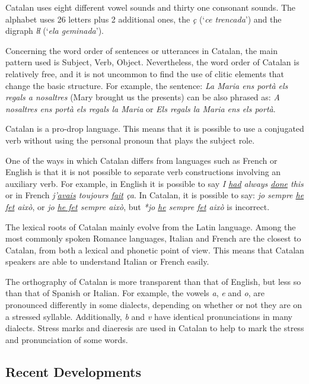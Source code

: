 \begin{multicols}{2}
Catalan uses eight different vowel sounds and thirty one consonant sounds. The alphabet uses 26 letters plus 2 additional ones, the \textit{ç} (‘\textit{ce trencada}’) and the digraph \textit{ŀl} (‘\textit{ela geminada}’).


Concerning the word order of sentences or utterances in Catalan, the main pattern used is Subject, Verb, Object. Nevertheless, the word order of Catalan is relatively free, and it is not uncommon to find the use of clitic elements that change the basic structure. For example, the sentence: \textit{La Maria ens portà els regals a nosaltres} (Mary brought us the presents) can be also phrased as: \textit{A nosaltres ens portà els regals la Maria} or \textit{Els regals la Maria ens els portà}.

Catalan is a pro-drop language. This means that it is possible to use a conjugated verb without using the personal pronoun that plays the subject role.

One of the ways in which Catalan differs from languages such as  French or English is that it is not possible to separate verb constructions involving an auxiliary verb. For example, in English it is possible to say \textit{I \underline{had} always \underline{done} this} or in French \textit{j'\underline{avais} toujours \underline{fait} ça}. In Catalan, it is possible to say: \textit{jo sempre \underline{he fet} això}, or \textit{jo \underline{he fet} sempre això}, but \textit{*jo \underline{he} sempre \underline{fet} això} is incorrect.

The lexical roots of Catalan mainly evolve from the Latin language. Among the most commonly spoken Romance languages, Italian and French are the closest to Catalan, from both a lexical and phonetic point of view. This means that Catalan speakers are able to understand Italian or French easily.

The orthography of Catalan is more transparent than that of English, but less so than that of Spanish or Italian. For example, the vowels \textit{a}, \textit{e} and \textit{o}, are pronounced differently in some dialects, depending on whether or not they are on a stressed syllable. Additionally, \textit{b} and \textit{v} have identical pronunciations in many dialects. Stress marks and diaeresis are used in Catalan to help to mark the stress and pronunciation of some words.

\subsection{Recent Developments}


\end{multicols}
